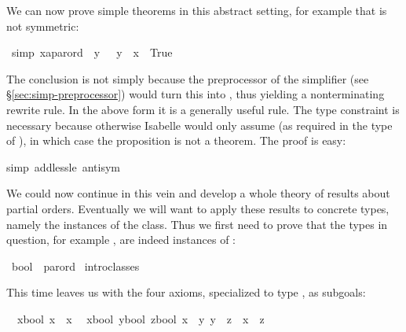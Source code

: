 \begin{isabellebody}
\begin{isamarkuptext}
We can now prove simple theorems in this abstract setting, for example
that \isa{{\isacharless}{\isacharless}} is not symmetric:%
\end{isamarkuptext}%
\ {\isacharbrackleft}simp{\isacharbrackright}{\isacharcolon}\ {\isachardoublequote}{\isacharparenleft}x{\isacharcolon}{\isacharcolon}{\isacharprime}a{\isacharcolon}{\isacharcolon}parord{\isacharparenright}\ {\isacharless}{\isacharless}\ y\ {\isasymLongrightarrow}\ {\isacharparenleft}{\isasymnot}\ y\ {\isacharless}{\isacharless}\ x{\isacharparenright}\ {\isacharequal}\ True{\isachardoublequote}%
\begin{isamarkuptxt}%
\noindent
The conclusion is not simply  because the preprocessor
of the simplifier (see \S\ref{sec:simp-preprocessor})
would turn this into , thus yielding
a nonterminating rewrite rule. In the above form it is a generally useful
rule.
The type constraint is necessary because otherwise Isabelle would only assume
 (as required in the type of \isa{{\isacharless}{\isacharless}}), in
which case the proposition is not a theorem.  The proof is easy:%
\end{isamarkuptxt}%
simp\ add{\isacharcolon}less{\isacharunderscore}le\ antisym{\isacharparenright}%
\begin{isamarkuptext}%
We could now continue in this vein and develop a whole theory of
results about partial orders. Eventually we will want to apply these results
to concrete types, namely the instances of the class. Thus we first need to
prove that the types in question, for example , are indeed
instances of :%
\end{isamarkuptext}%
\ bool\ {\isacharcolon}{\isacharcolon}\ parord\isanewline
{}\ intro{\isacharunderscore}classes%
\begin{isamarkuptxt}%
\noindent
This time  leaves us with the four axioms,
specialized to type , as subgoals:
\begin{isabelle}%
\ {}{\isachardot}\ {\isasymAnd}x{\isasymColon}bool{\isachardot}\ x\ {\isacharless}{\isacharless}{\isacharequal}\ x\isanewline
\ {}{\isachardot}\ {\isasymAnd}{\isacharparenleft}x{\isasymColon}bool{\isacharparenright}\ {\isacharparenleft}y{\isasymColon}bool{\isacharparenright}\ z{\isasymColon}bool{\isachardot}\ {\isasymlbrakk}x\ {\isacharless}{\isacharless}{\isacharequal}\ y{\isacharsemicolon}\ y\ {\isacharless}{\isacharless}{\isacharequal}\ z{\isasymrbrakk}\ {\isasymLongrightarrow}\ x\ {\isacharless}{\isacharless}{\isacharequal}\ z\isanewline

\end{isabelle}
\end{isamarkuptxt}
\end{isabellebody}
